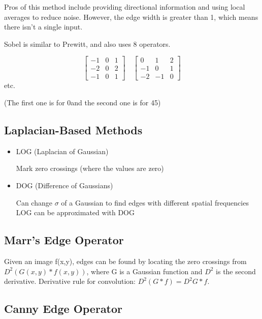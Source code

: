 \documentclass{article}
\begin{document}
\begin{multicols}{2}
Pros of this method include providing directional information and using local averages to reduce noise. However, the edge width is greater than 1, which means there isn't a single input.

Sobel is similar to Prewitt, and also uses 8 operators.

        \[
          \begin{bmatrix}
            -1 & 0 & 1\\
            -2 & 0 & 2\\
            -1 & 0 & 1
          \end{bmatrix}\quad
          \begin{bmatrix}
            0 & 1 & 2\\
            -1 & 0 & 1\\
            -2 & -1 & 0
          \end{bmatrix}
        \]
etc.

(The first one is for 0\textdegree and the second one is for 45\textdegree)

\subsection{Laplacian-Based Methods}

\begin{itemize}
  \item {LOG (Laplacian of Gaussian)}
  
  Mark zero crossings (where the values are zero)
  \item {DOG (Difference of Gaussians)}
  
  Can change $\sigma$ of a Gaussian to find edges with different spatial frequencies
  LOG can be approximated with DOG
\end{itemize}

\subsection{Marr's Edge Operator}

Given an image f(x,y), edges can be found by locating the zero crossings from \(D^2(G(x,y)*f(x,y))\), where G is a Gaussian function and $D^2$ is the second derivative.
Derivative rule for convolution: \(D^2(G*f) = D^2G * f\).

\subsection{Canny Edge Operator}


\end{multicols}
\end{document}
